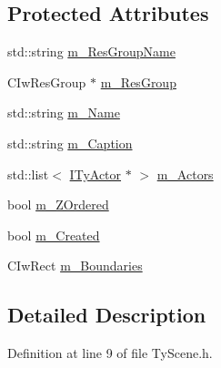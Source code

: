 \subsection*{Protected Attributes}
\begin{DoxyCompactItemize}
\item 
std::string \hyperlink{class_ty_scene_aea0b3d468bd83b94ee663c5a10e2e7cf}{m\_\-ResGroupName}
\item 
CIwResGroup $\ast$ \hyperlink{class_ty_scene_abb64484343fc018c448facb6df37c45e}{m\_\-ResGroup}
\item 
std::string \hyperlink{class_ty_scene_a310557de7a16133cd2d189e03cb395ac}{m\_\-Name}
\item 
std::string \hyperlink{class_ty_scene_a357f5bb0add663dfe7133073163b880c}{m\_\-Caption}
\item 
std::list$<$ \hyperlink{class_i_ty_actor}{ITyActor} $\ast$ $>$ \hyperlink{class_ty_scene_a2cd732152ac51a90ecd3f4ba2d83f318}{m\_\-Actors}
\item 
bool \hyperlink{class_ty_scene_aa23591667f1d19ae881d2ed9de96414f}{m\_\-ZOrdered}
\item 
bool \hyperlink{class_ty_scene_a5dddd2fb7a5dd01525c2a007c29285a1}{m\_\-Created}
\item 
CIwRect \hyperlink{class_ty_scene_ae51934772965f8104eafcaab3b730e3a}{m\_\-Boundaries}
\end{DoxyCompactItemize}


\subsection{Detailed Description}


Definition at line 9 of file TyScene.h.



